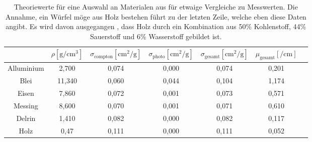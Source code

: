 \begin{table}
    \centering
    \caption{Theoriewerte für eine Auswahl an Materialen aus \cite{wqs} für etwaige Vergleiche zu Messwerten.
            Die Annahme, ein Würfel möge aus Holz bestehen führt zu der letzten Zeile, welche eben diese Daten angibt. Es wird davon ausgegangen \cite{holz}, dass
            Holz durch ein Kombination aus 50\% Kohlenstoff, 44\% Sauerstoff und 6\% Wasserstoff gebildet ist. } 
    \label{tab:2}
    \begin{tabular}{c c c c c c c}
    \toprule
    & $\rho [\si{\gram\per\centi\meter^3}]$ & $\sigma_{\text{compton}} [\si{\centi\meter^2\per\gram}] $ & $\sigma_{\text{photo}} [\si{\centi\meter^2\per\gram}] $  & $\sigma_{\text{gesamt}} [\si{\centi\meter^2\per\gram}]$ &  $\mu_{\text{gesamt}}[\si{\per\centi\meter}]$ \\
    \midrule
    Alluminium  &2,700 & 0,074   & 0,000 & 0,074 &  0,201 \\        
    Blei        &11,340& 0,060   & 0,044 & 0,104 &  1,174 \\    
    Eisen       &7,860 & 0,072   & 0,001 & 0,073 &  0,571 \\    
    Messing     &8,600 & 0,070   & 0,001 & 0,071 &  0,610 \\    
    Delrin      &1,410 & 0,082   & 0,000 & 0,082 &  0,117 \\    
    Holz &  0,47 & 0,111  & 0,000 & 0,111 & 0,052 \\
\end{tabular}
\end{table}



